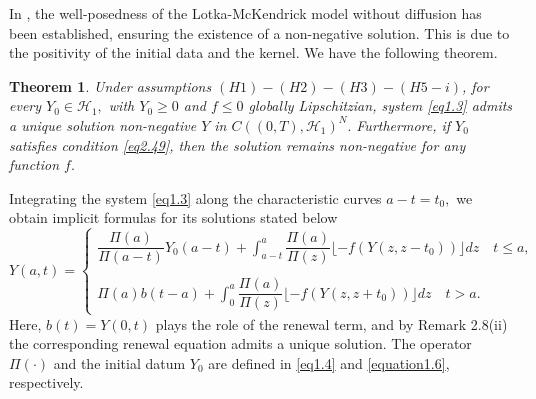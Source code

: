 \documentclass[10pt, a4paper]{amsart}
\newcounter{assu}
\theoremstyle{plain}
\newtheorem{theorem}[lemma]{Theorem}
\theoremstyle{definition}
\theoremstyle{remark}
\numberwithin{equation}{section}
\begin{document}
In \cite[Theorem 2.1.1]{ref21}, the well-posedness of the Lotka-McKendrick model without diffusion has been established, ensuring the existence of a non-negative solution. This is due to the positivity of the initial data and the kernel. We have the following theorem. 
\begin{theorem}\label{th2.6}
Under assumptions $(H1)-(H2)-(H3)-(H5-i)$, for every $Y_0\in \mathcal{H}_1,$ with $Y_0\geq 0$ and $f\leq 0$ globally Lipschitzian, system \eqref{eq1.3} admits a unique solution non-negative  $Y$ in $C((0, T), \mathcal{H}_1)^ N.$ Furthermore, if $Y_0$ satisfies condition \eqref{eq2.49}, then the solution remains non-negative for any  function $f.$
\end{theorem}
Integrating the system \eqref{eq1.3} along the characteristic curves $a-t=t_0,$ we obtain implicit formulas for its solutions stated below
\begin{equation}
Y(a,t)=\left\lbrace
\begin{array}{ll}
\dfrac{\Pi(a)}{\Pi(a-t)}Y_{0}(a-t)+\displaystyle\int_{a-t}^{a}\dfrac{\Pi(a)}{\Pi(z)}\lfloor -f(Y(z,z-t_0))\rfloor dz\quad t\leq a,\\
\\\Pi(a)b(t-a)+\displaystyle\int_{0}^{a}\dfrac{\Pi(a)}{\Pi(z)}\lfloor -f(Y(z,z+t_0))\rfloor dz\quad t> a.
\end{array}
\right.
\end{equation}
Here, $b(t)=Y(0,t)$ plays the role of the renewal term, and by Remark 2.8(ii) the corresponding renewal equation admits a unique solution. The operator $\Pi(\cdot)$ and the initial datum $Y_{0}$ are defined in \eqref{eq1.4} and \eqref{equation1.6}, respectively. 
\end{document}
